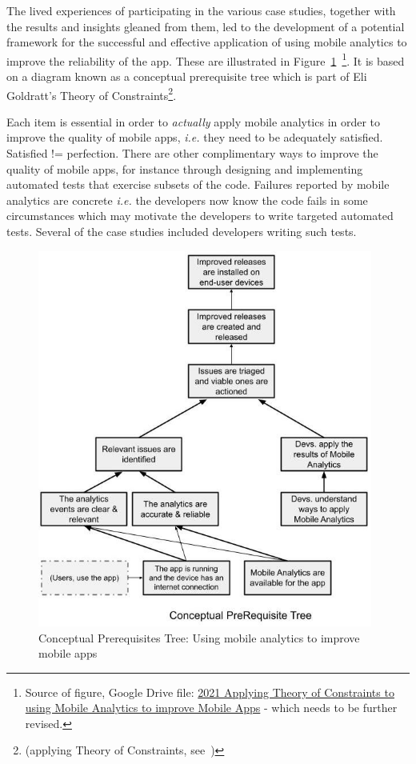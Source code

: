 The lived experiences of participating in the various case studies, together with the results and insights gleaned from them, led to the development of a potential framework for the successful and effective application of using mobile analytics to improve the reliability of the app. These are illustrated in Figure~\ref{fig:using-toc-cpt-using-mobile-analytics-to-improve-mobile-apps}~\footnote{Source of figure, Google Drive file:  \href{https://docs.google.com/document/d/16PaSFRVzg1b2Nykly8qzaTAHtJqtEwgrK754wuek53M/edit}{2021 Applying Theory of Constraints to using Mobile Analytics to improve Mobile Apps} - which needs to be further revised.}. It is based on a diagram known as a conceptual prerequisite tree which is part of Eli Goldratt's Theory of Constraints\footnote{(applying Theory of Constraints, see~\citep{goldratt2017_necessary_but_not_sufficient, lepore1999_deming_and_goldratt, scheinkopf1999_thinking_for_a_change})}. 

Each item is essential in order to \emph{actually} apply mobile analytics in order to improve the quality of mobile apps, \emph{i.e.} they need to be adequately satisfied. Satisfied != perfection. There are other complimentary ways to improve the quality of mobile apps, for instance through designing and implementing automated tests that exercise subsets of the code. Failures reported by mobile analytics are concrete \emph{i.e.} the developers now know the code fails in some circumstances which may motivate the developers to write targeted automated tests. Several of the case studies included developers writing such tests. 

\begin{figure}
    \centering
    \includegraphics[width=11cm]{images/my/Conceptual_prereq_tree_Applying_Theory_of_Constraints_to_using_Mobile_Analytics_to_improve_Mobile_Apps.jpeg}
    \caption{Conceptual Prerequisites Tree: Using mobile analytics to improve mobile apps}
    \label{fig:using-toc-cpt-using-mobile-analytics-to-improve-mobile-apps}
\end{figure}



